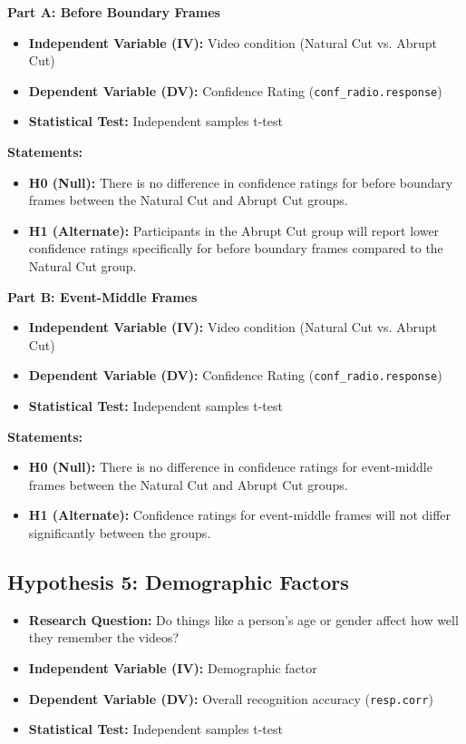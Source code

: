 \documentclass[10pt,a4paper]{article}
\begin{document}
\textbf{Part A: Before Boundary Frames}
\begin{itemize}
    \item \textbf{Independent Variable (IV):} Video condition (Natural Cut vs. Abrupt Cut)
    \item \textbf{Dependent Variable (DV):} Confidence Rating (\texttt{conf\_radio.response})      
    \item \textbf{Statistical Test:} Independent samples t-test
\end{itemize}

\textbf{Statements:}
\begin{itemize}
    \item \textbf{H0 (Null):} There is no difference in confidence ratings for before boundary frames between the Natural Cut and Abrupt Cut groups.
    \item \textbf{H1 (Alternate):} Participants in the Abrupt Cut group will report lower confidence ratings specifically for before boundary frames compared to the Natural Cut group.
\end{itemize}

\textbf{Part B: Event-Middle Frames}
\begin{itemize}
    \item \textbf{Independent Variable (IV):} Video condition (Natural Cut vs. Abrupt Cut)
    \item \textbf{Dependent Variable (DV):} Confidence Rating (\texttt{conf\_radio.response})      
    \item \textbf{Statistical Test:} Independent samples t-test
\end{itemize}

\textbf{Statements:}
\begin{itemize}
    \item \textbf{H0 (Null):} There is no difference in confidence ratings for event-middle frames between the Natural Cut and Abrupt Cut groups.
    \item \textbf{H1 (Alternate):} Confidence ratings for event-middle frames will not differ significantly between the groups.
\end{itemize}

\subsection{Hypothesis 5: Demographic Factors}
\begin{itemize}
    \item \textbf{Research Question:} Do things like a person's age or gender affect how well they remember the videos?
    \item \textbf{Independent Variable (IV):} Demographic factor
    \item \textbf{Dependent Variable (DV):} Overall recognition accuracy (\texttt{resp.corr})
    \item \textbf{Statistical Test:} Independent samples t-test
\end{itemize}
\end{document}
